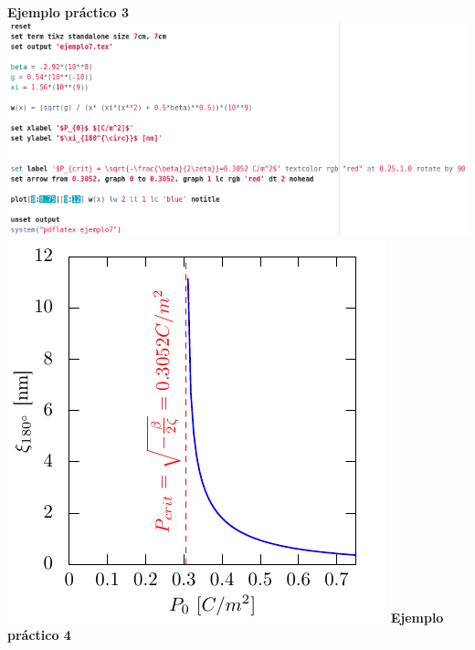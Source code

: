\documentclass[11.5pt,a4paper]{article}
\begin{document}
\textbf{Ejemplo práctico 3}\\

\includegraphics[scale=0.50]{screen5.png}
\includegraphics[scale=0.80]{ejemplo7.pdf}
\newpage
\textbf{Ejemplo práctico 4}\\
\end{document}
